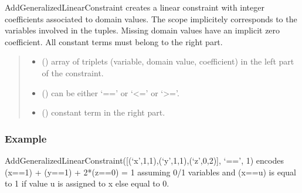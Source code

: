 \documentclass[letterpaper,10pt,openany,oneside,english]{sphinxmanual}
\begin{document}
\begin{fulllineitems}

\begin{fulllineitems}
\label{\detokenize{ref/ref_python:pytoulbar2.CFN.AddGeneralizedLinearConstraint}}
\pysigstartsignatures
{}
\pysigstopsignatures
\sphinxAtStartPar
AddGeneralizedLinearConstraint creates a linear constraint with integer coefficients associated to domain values.
The scope implicitely corresponds to the variables involved in the tuples. Missing domain values have an implicit zero coefficient.
All constant terms must belong to the right part.
\begin{quote}\begin{description}
\begin{itemize}
\item {} 
\sphinxAtStartPar
{} () \textendash{} array of triplets (variable, domain value, coefficient) in the left part of the constraint.

\item {} 
\sphinxAtStartPar
{} () \textendash{} can be either ‘==’ or ‘\textless{}=’ or ‘\textgreater{}=’.

\item {} 
\sphinxAtStartPar
{} () \textendash{} constant term in the right part.

\end{itemize}

\end{description}\end{quote}
\subsubsection*{Example}

\sphinxAtStartPar
AddGeneralizedLinearConstraint({[}(‘x’,1,1),(‘y’,1,1),(‘z’,0,2){]}, ‘==’, 1) encodes (x==1) + (y==1) + 2*(z==0) = 1 assuming 0/1 variables and (x==u) is equal to 1 if value u is assigned to x else equal to 0.


\end{fulllineitems}
\end{fulllineitems}
\end{document}
